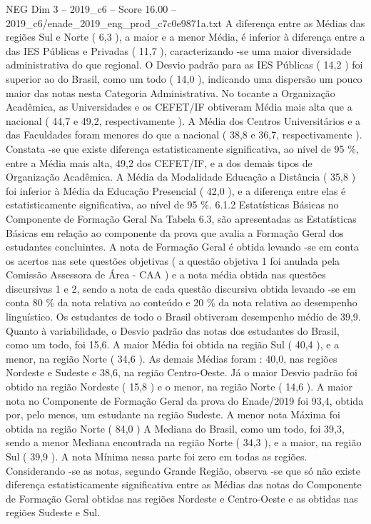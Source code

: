 \begin{textsample}{NEG Dim 3 – 2019\_c6 – Score 16.00 – 2019\_c6/enade\_2019\_eng\_prod\_c7c0e9871a.txt}
A diferença entre as Médias das regiões Sul e Norte ( 6,3 ), a maior e a menor Média, é inferior à diferença entre a das IES Públicas e Privadas ( 11,7 ), caracterizando -se uma maior diversidade administrativa do que regional.
O Desvio padrão para as IES Públicas ( 14,2 ) foi superior ao do Brasil, como um todo ( 14,0 ), indicando uma dispersão um pouco maior das notas nesta Categoria Administrativa.
No tocante a Organização Acadêmica, as Universidades e os CEFET/IF obtiveram Média mais alta que a nacional ( 44,7 e 49,2, respectivamente ).
A Média dos Centros Universitários e a das Faculdades foram menores do que a nacional ( 38,8 e 36,7, respectivamente ).
Constata -se que existe diferença estatisticamente significativa, ao nível de 95 \%, entre a Média mais alta, 49,2 dos CEFET/IF, e a dos demais tipos de Organização Acadêmica.
A Média da Modalidade Educação a Distância ( 35,8 ) foi inferior à Média da Educação Presencial ( 42,0 ), e a diferença entre elas é estatisticamente significativa, ao nível de 95 \%. 6.1.2 Estatísticas Básicas no Componente de Formação Geral Na Tabela 6.3, são apresentadas as Estatísticas Básicas em relação ao componente da prova que avalia a Formação Geral dos estudantes concluintes.
A nota de Formação Geral é obtida levando -se em conta os acertos nas sete questões objetivas ( a questão objetiva 1 foi anulada pela Comissão Assessora de Área - CAA ) e a nota média obtida nas questões discursivas 1 e 2, sendo a nota de cada questão discursiva obtida levando -se em conta 80 \% da nota relativa ao conteúdo e 20 \% da nota relativa ao desempenho linguístico.
Os estudantes de todo o Brasil obtiveram desempenho médio de 39,9.
Quanto à variabilidade, o Desvio padrão das notas dos estudantes do Brasil, como um todo, foi 15,6.
A maior Média foi obtida na região Sul ( 40,4 ), e a menor, na região Norte ( 34,6 ).
As demais Médias foram : 40,0, nas regiões Nordeste e Sudeste e 38,6, na região Centro-Oeste.
Já o maior Desvio padrão foi obtido na região Nordeste ( 15,8 ) e o menor, na região Norte ( 14,6 ).
A maior nota no Componente de Formação Geral da prova do Enade/2019 foi 93,4, obtida por, pelo menos, um estudante na região Sudeste.
A menor nota Máxima foi obtida na região Norte ( 84,0 ) A Mediana do Brasil, como um todo, foi 39,3, sendo a menor Mediana encontrada na região Norte ( 34,3 ), e a maior, na região Sul ( 39,9 ).
A nota Mínima nessa parte foi zero em todas as regiões.
Considerando -se as notas, segundo Grande Região, observa -se que só não existe diferença estatisticamente significativa entre as Médias das notas do Componente de Formação Geral obtidas nas regiões Nordeste e Centro-Oeste e as obtidas nas regiões Sudeste e Sul.

\end{textsample}
